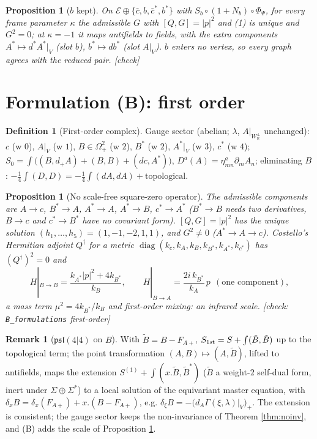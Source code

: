 \documentclass[11pt]{article}
\theoremstyle{plain}
\newtheorem{proposition}[theorem]{Proposition}
\theoremstyle{definition}
\newtheorem{definition}[theorem]{Definition}
\newtheorem{remark}[theorem]{Remark}
\numberwithin{equation}{section}
\begin{document}
\begin{proposition}[$b$ kept]
\label{prop:bkept}
On $\mathscr E\oplus\{\bar c,b,\bar c^*,b^*\}$ with $S_b\circ(1+N_b)\circ\Phi_\Psi$, for every frame parameter $\kappa$ the admissible $G$ with $[Q,G]=|p|^2$ and (1) is unique and $G^2=0$; at $\kappa=-1$ it maps antifields to fields, with the extra components $A^*\mapsto d^*A^*|_V$ (slot $b$), $b^*\mapsto db^*$ (slot $A|_V$). $b$ enters no vertex, so every graph agrees with the reduced pair. [check]
\end{proposition}

\section{Formulation (B): first order}

\begin{definition}[First-order complex]
Gauge sector (abelian; $\lambda$, $A|_{W_{\mathbb R}^\perp}$ unchanged): $c$ (w $0$), $A|_V$ (w $1$), $B\in\Omega^2_+$ (w $2$), $B^*$ (w $2$), $A^*|_V$ (w $3$), $c^*$ (w $4$); $S_0=\int\big((B,d_+A)+(B,B)+(dc,A^*)\big)$, $D^a(A)=\eta^a_{mn}\partial_mA_n$; eliminating $B$: $-\tfrac14\int(D,D)=-\tfrac14\int(dA,dA)+\text{topological}$.
\end{definition}

\begin{proposition}[No scale-free square-zero operator]
\label{prop:fo}
The admissible components are $A\to c$, $B^*\to A$, $A^*\to A$, $A^*\to B$, $c^*\to A^*$ ($B^*\to B$ needs two derivatives, $B\to c$ and $c^*\to B^*$ have no covariant form). $[Q,G]=|p|^2$ has the unique solution $(h_1,\dots,h_5)=(1,-1,-2,1,1)$, and $G^2\neq0$ ($A^*\to A\to c$). Costello's Hermitian adjoint $Q^\dagger$ for a metric $\operatorname{diag}(k_c,k_A,k_B,k_{B^*},k_{A^*},k_{c^*})$ has $(Q^\dagger)^2=0$ and
\[
H|_{B\to B}=\frac{k_{A^*}|p|^2+4k_{B^*}}{k_B},\qquad H|_{B\to A}=\frac{2i\,k_{B^*}}{k_A}\,p\ \ (\text{one component}),
\]
a mass term $\mu^2=4k_{B^*}/k_B$ and first-order mixing: an infrared scale. [check: \texttt{B\_formulations} first-order]
\end{proposition}

\begin{remark}[$\mathfrak{psl}(4|4)$ on $B$]
With $\tilde B=B-F_{A+}$, $S_{\rm 1st}=S+\int(\tilde B,\tilde B)$ up to the topological term; the point transformation $(A,B)\mapsto(A,\tilde B)$, lifted to antifields, maps the extension $S^{(1)}+\int(x.\tilde B,\tilde B^*)$ ($\tilde B$ a weight-$2$ self-dual form, inert under $\Sigma\oplus\Sigma^*$) to a local solution of the equivariant master equation, with $\delta_xB=\delta_x(F_{A+})+x.(B-F_{A+})$, e.g. $\delta_\xi B=-\big(d_A\Gamma(\xi,\lambda)|_V\big)_+$. The extension is consistent; the gauge sector keeps the non-invariance of Theorem \ref{thm:noinv}, and (B) adds the scale of Proposition \ref{prop:fo}.
\end{remark}
\end{document}
